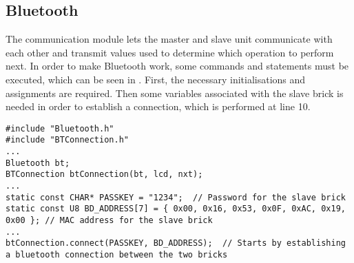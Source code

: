 

%	


\subsection{Bluetooth}

The communication module lets the master and slave unit communicate with each other and transmit values used to determine which operation to perform next. In order to make Bluetooth work, some commands and statements must be executed, which can be seen in . First, the necessary initialisations and assignments are required. Then some variables associated with the slave brick is needed in order to establish a connection, which is performed at line 10. 

\begin{lstlisting}[caption= Bluetooth connection initialization, label=lst:bluetoothconnection]
#include "Bluetooth.h"
#include "BTConnection.h"
...
Bluetooth bt;
BTConnection btConnection(bt, lcd, nxt);
...
static const CHAR* PASSKEY = "1234";  // Password for the slave brick
static const U8 BD_ADDRESS[7] = { 0x00, 0x16, 0x53, 0x0F, 0xAC, 0x19, 0x00 }; // MAC address for the slave brick
...
btConnection.connect(PASSKEY, BD_ADDRESS);  // Starts by establishing a bluetooth connection between the two bricks
\end{lstlisting}

